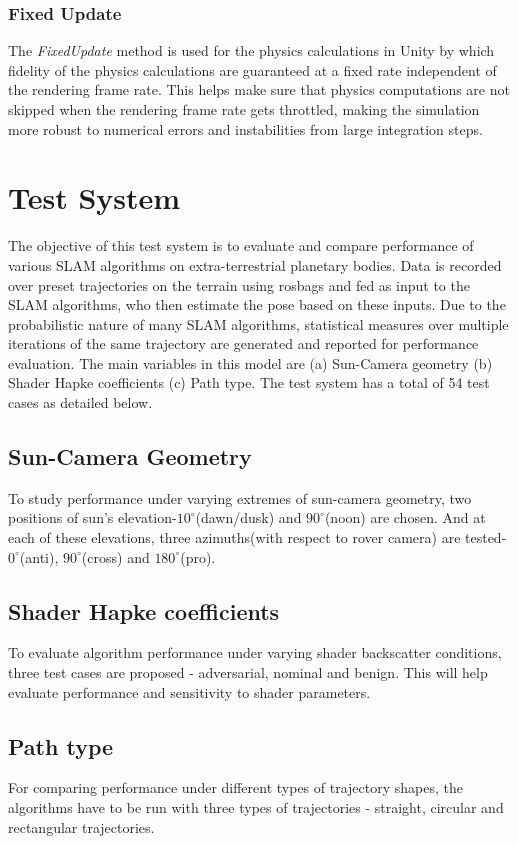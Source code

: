 \documentclass[a4paper, 10pt, conference]{ieeeconf}      %
\begin{document}
\subsubsection{Fixed Update}
The \textit{FixedUpdate} method is used for the physics calculations in Unity by which fidelity of the physics calculations are guaranteed at a fixed rate independent of the rendering frame rate. This helps make sure that physics computations are not skipped when the rendering frame rate gets throttled, making the simulation more robust to numerical errors and instabilities from large integration steps.
\section{Test System}
The objective of this test system is to evaluate and compare performance of various SLAM algorithms on extra-terrestrial planetary bodies. Data is recorded over preset trajectories on the terrain using rosbags and fed as input to the SLAM algorithms, who then estimate the pose based on these inputs. Due to the probabilistic nature of many SLAM algorithms, statistical measures over multiple iterations of the same trajectory are generated and reported for performance evaluation.
The main variables in this model are (a) Sun-Camera geometry (b) Shader Hapke coefficients (c) Path type. The test system has a total of 54 test cases as detailed below.
\subsection{Sun-Camera Geometry}
To study performance under varying extremes of sun-camera geometry, two positions of sun's elevation-$10^\circ$(dawn/dusk) and $90^\circ$(noon) are chosen. And at each of these elevations,  three azimuths(with respect to rover camera) are tested-$0^\circ$(anti), $90^\circ$(cross) and $180^\circ$(pro). 
\subsection{Shader Hapke coefficients}
To evaluate algorithm performance under varying shader backscatter conditions, three test cases are proposed - adversarial, nominal and benign. This will help evaluate performance and sensitivity to shader parameters.
\subsection{Path type}
For comparing performance under different types of trajectory shapes, the algorithms have to be run with three types of trajectories - straight, circular and rectangular trajectories.
\end{document}
